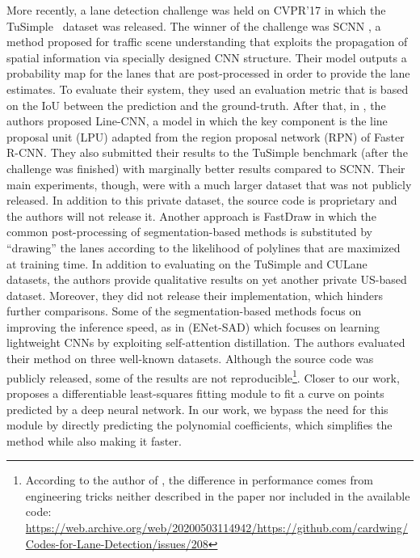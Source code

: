 \documentclass[a4paper,conference]{IEEEtran}
\begin{document}
More recently, a lane detection challenge was held on CVPR'17 in which the TuSimple~\cite{tusimple-benchmark} dataset was released. The winner of the challenge was SCNN \cite{scnn2018aaai}, a method proposed for traffic scene understanding that exploits the propagation of spatial information via specially designed CNN structure. Their model outputs a probability map for the lanes that are post-processed in order to provide the lane estimates. To evaluate their system, they used an evaluation metric that is based on the IoU between the prediction and the ground-truth. After that, in \cite{linecnn2019tits}, the authors proposed Line-CNN, a model in which the key component is the line proposal unit (LPU) adapted from the region proposal network (RPN) of Faster R-CNN. They also submitted their results to the TuSimple benchmark (after the challenge was finished) with marginally better results compared to SCNN. Their main experiments, though, were with a much larger dataset that was not publicly released. In addition to this private dataset, the source code is proprietary and the authors will not release it. Another approach is FastDraw \cite{fastdraw2019cvpr} in which the common post-processing of segmentation-based methods is substituted by ``drawing'' the lanes according to the likelihood of polylines that are maximized at training time. In addition to evaluating on the TuSimple and CULane~\cite{scnn2018aaai} datasets, the authors provide qualitative results on yet another private US-based dataset. Moreover, they did not release their implementation, which hinders further comparisons. Some of the segmentation-based methods focus on improving the inference speed, as in \cite{enetsad2019iccv} (ENet-SAD) which focuses on learning lightweight CNNs by exploiting self-attention distillation. The authors evaluated their method on three well-known datasets. Although the source code was publicly released, some of the results are not reproducible\footnote{According to the author of \cite{enetsad2019iccv}, the difference in performance comes from engineering tricks neither described in the paper nor included in the available code: \url{https://web.archive.org/web/20200503114942/https://github.com/cardwing/Codes-for-Lane-Detection/issues/208}}. Closer to our work, \cite{wvangansbeke_2019} proposes a differentiable least-squares fitting module to fit a curve on points predicted by a deep neural network. In our work, we bypass the need for this module by directly predicting the polynomial coefficients, which simplifies the method while also making it faster.
\end{document}
